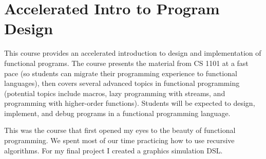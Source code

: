 \section{Accelerated Intro to Program Design}

\begin{meta}
\end{meta}

\coursedesc
This course provides an accelerated introduction to design and
implementation of functional programs. The course presents the material
from CS 1101 at a fast pace (so students can migrate their programming
experience to functional languages), then covers several advanced
topics in functional programming (potential topics include macros, lazy
programming with streams, and programming with higher-order functions).
Students will be expected to design, implement, and debug programs in a
functional programming language.

\courseself
This was the course that first opened my eyes to the beauty of
functional programming. We spent most of our time practicing how to
use recursive algorithms. For my final project I created a graphics
simulation DSL.

